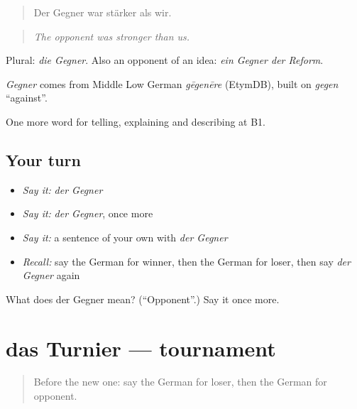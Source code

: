 \begin{quote}
Der Gegner war stärker als wir.
\end{quote}

\begin{quote}
\emph{The opponent was stronger than us.}
\end{quote}

Plural: \emph{die Gegner}. Also an opponent of an idea: \emph{ein Gegner der Reform}.

\begin{cousinweb}
\emph{Gegner} comes from Middle Low German \emph{gēgenēre} (EtymDB), built on \emph{gegen} \textquotedblleft{}against\textquotedblright{}.
\end{cousinweb}

\begin{grammarlens}[title={What you've built}]
One more word for telling, explaining and describing at B1.
\end{grammarlens}

\subsection*{Your turn}
\begin{itemize}
\raggedright
  \item \emph{Say it:} \emph{der Gegner}
  \item \emph{Say it:} \emph{der Gegner}, once more
  \item \emph{Say it:} a sentence of your own with \emph{der Gegner}
  \item \emph{Recall:} say the German for winner, then the German for loser, then say \emph{der Gegner} again
\end{itemize}

\begin{tcolorbox}[breakable,colback=teal!4,colframe=teal!35!black,title={Before you move on}]
What does der Gegner mean? (\textquotedblleft{}Opponent\textquotedblright{}.) Say it once more.
\end{tcolorbox}
\section[das Turnier]{das Turnier — tournament}

\label{lesson:GE-C508-turnier}



\begin{quote}
Before the new one: say the German for loser, then the German for opponent.
\end{quote}

